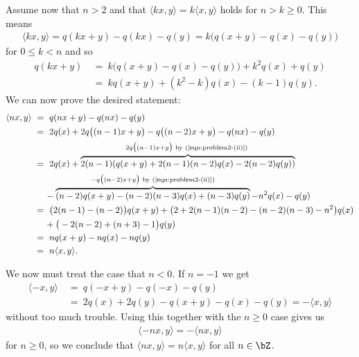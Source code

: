 \begin{homework}[e]
\begin{prf}
		Assume now that $n > 2$ and that $\langle kx,y\rangle = k\langle x,y\rangle$ holds for $n > k\geq 0$. This means
		\begin{align*}
			\langle kx,y\rangle = q(kx+y) - q(kx) - q(y) = k\big(q(x+y) - q(x) - q(y)\big)
		\end{align*}
		for $0 \leq k < n$ and so
		\begin{align*}\tag{$\ast$}\label{eqn:problem2-(ii)}
			q(kx + y) &~=~ k\big(q(x+y) - q(x) - q(y)\big) + k^2q(x) + q(y) \\
					  &~=~ kq(x+y) + (k^2 - k)q(x) - (k-1)q(y).
		\end{align*}
		We can now prove the desired statement:
		\begin{align*}
			\langle nx,y\rangle &~=~ q(nx + y) - q(nx) - q(y) \\
			  &~=~ 2q(x) + 2q\big((n-1)x + y\big) - q\big((n-2)x + y\big) - q(nx) - q(y) \\
			  &~=~ 2q(x) + \overbrace{2(n-1)(q(x+y)+2(n-1)(n-2)q(x) - 2(n-2)q(y))}^{2q\big((n-1)x + y\big) \text{ by (\ref{eqn:problem2-(ii)}) }} \\
			  &\hspace{1.5em} - \overbrace{(n-2)q(x+y) - (n-2)(n-3)q(x) + (n-3)q(y)}^{-q\big((n-2)x+y\big) \text{ by (\ref{eqn:problem2-(ii)})}} - n^2q(x) - q(y) \\
			  &~=~ \big(2(n-1) -(n-2)\big)q(x+y) +\big(2 + 2(n-1)(n-2)-(n-2)(n-3)-n^2\big)q(x) \\
			  &\hspace{1.5em}+ \big(-2(n-2)+(n+3)-1\big)q(y) \\
			  &~=~ nq(x+y) - nq(x) - nq(y) \\
			  &~=~ n\langle x,y\rangle.
		\end{align*}
        
		We now must treat the case that $n < 0$. If $n = -1$ we get
		\begin{align*}
			\langle -x,y\rangle &~=~ q(-x + y) - q(-x) - q(y) \\
			  &~=~ 2q(x) + 2q(y) - q(x+y) - q(x) - q(y) = -\langle x,y\rangle
		\end{align*}
		without too much trouble. Using this together with the $n\geq 0$ case gives us
		 \begin{align*}
			\langle -nx,y\rangle = - \langle nx,y\rangle
		\end{align*}
	    for $n \geq 0$, so we conclude that $\langle nx,y\rangle = n\langle x,y\rangle$ for all $n \in \bZ$.

		\bigskip


\end{prf}
\end{homework}
